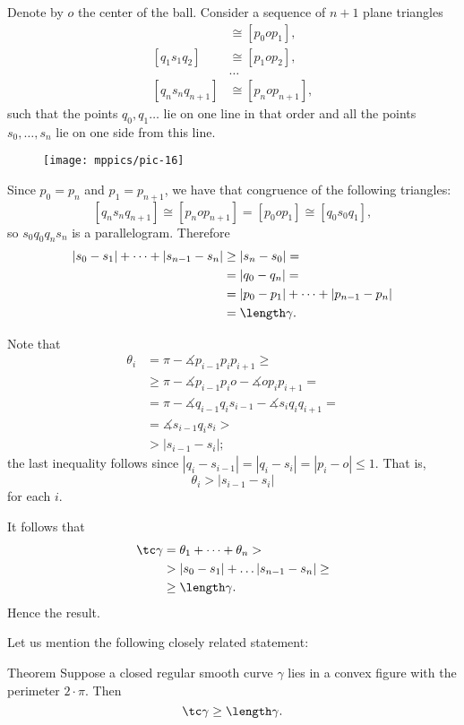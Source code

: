 Denote by $o$ the center of the ball.
Consider a sequence of $n+1$ plane triangles
\begin{align*}
[q_0s_0q_1]
&\cong 
[p_0op_1],
\\
[q_1s_1q_2]
&\cong 
[p_1op_2],
\\
&\dots
\\
[q_{n}s_nq_{n+1}]
&\cong 
[p_nop_{n+1}],
\end{align*}
such that the points $q_0,q_1\dots$ lie on one line in that order and all the points $s_0,\dots,s_n$ lie on one side from this line.

\begin{figure}[h!]
\vskip-0mm
\centering
\texttt{[image: mppics/pic-16]}
\vskip0mm
\end{figure}

Since $p_0=p_n$ and $p_1=p_{n+1}$, we have that congruence of the following triangles:
\[[q_{n}s_nq_{n+1}]\cong 
[p_nop_{n+1}]=[p_0op_1]\cong[q_{0}s_0q_1],\]
so $s_0q_0q_ns_n$ is a parallelogram.
Therefore
\begin{align*}
|s_0-s_1|+\dots+|s_{n-1}-s_n|
&\ge|s_n-s_0|=
\\
&=|q_0-q_n|=
\\
&=|p_0-p_1|+\dots+|p_{n-1}-p_n|
\\
&=\length \gamma.
\end{align*}

Note that 
\begin{align*}
\theta_i&=\pi-\measuredangle p_{i-1}p_ip_{i+1}\ge
\\
&\ge\pi-\measuredangle p_{i-1}p_io-\measuredangle op_ip_{i+1}=
\\
&=\pi-\measuredangle q_{i-1}q_is_{i-1}-\measuredangle s_iq_iq_{i+1}=
\\
&=\measuredangle s_{i-1}q_is_i>
\\
&>|s_{i-1}-s_i|;
\end{align*}
the last inequality follows since $|q_i-s_{i-1}|=|q_i-s_i|=|p_i-o|\le 1$.
That is, 
\[\theta_i>|s_{i-1}-s_i|\]
for each $i$.

It follows that
\begin{align*}
\tc \gamma
&=\theta_1+\dots+\theta_n>
\\
&> |s_{0}-s_1|+\dots |s_{n-1}-s_n|\ge 
\\
&\ge\length \gamma.
\end{align*}
Hence the result.
\qeds


Let us mention the following closely related statement:

\begin{thm}{Theorem}
Suppose a closed regular smooth curve $\gamma$ lies in a convex figure with the perimeter $2\cdot \pi$.
Then 
\[\tc\gamma\ge \length\gamma.\]

\end{thm}

